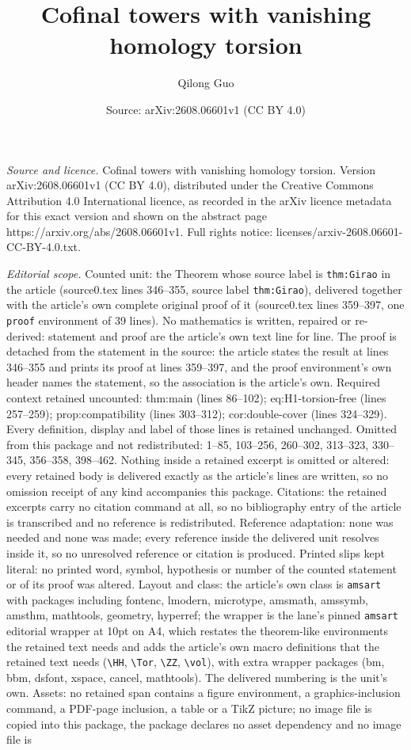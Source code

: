 \documentclass[10pt,a4paper]{amsart}
\title[Cofinal towers with vanishing homology torsion]{Cofinal towers with vanishing homology torsion}
\author{Qilong Guo}
\date{Source: arXiv:2608.06601v1 (CC BY 4.0)}
\begin{document}
\maketitle

\noindent\emph{Source and licence.} Cofinal towers with vanishing homology torsion. Version arXiv:2608.06601v1 (CC BY 4.0), distributed under the Creative Commons Attribution 4.0 International licence, as recorded in the arXiv licence metadata for this exact version and shown on the abstract page https://arxiv.org/abs/2608.06601v1. Full rights notice: licenses/arxiv-2608.06601-CC-BY-4.0.txt.\par\smallskip

\noindent\textit{Editorial scope.} Counted unit: the Theorem whose source label is \texttt{thm:Girao} in the article (source0.tex lines 346--355, source label \texttt{thm:Girao}), delivered together with the article's own complete original proof of it (source0.tex lines 359--397, one \texttt{proof} environment of 39 lines). No mathematics is written, repaired or re-derived: statement and proof are the article's own text line for line. The proof is detached from the statement in the source: the article states the result at lines 346--355 and prints its proof at lines 359--397, and the proof environment's own header names the statement, so the association is the article's own. Required context retained uncounted: thm:main (lines 86--102); eq:H1-torsion-free (lines 257--259); prop:compatibility (lines 303--312); cor:double-cover (lines 324--329). Every definition, display and label of those lines is retained unchanged. Omitted from this package and not redistributed: 1--85, 103--256, 260--302, 313--323, 330--345, 356--358, 398--462. Nothing inside a retained excerpt is omitted or altered: every retained body is delivered exactly as the article's lines are written, so no omission receipt of any kind accompanies this package. Citations: the retained excerpts carry no citation command at all, so no bibliography entry of the article is transcribed and no reference is redistributed. Reference adaptation: none was needed and none was made; every reference inside the delivered unit resolves inside it, so no unresolved reference or citation is produced. Printed slips kept literal: no printed word, symbol, hypothesis or number of the counted statement or of its proof was altered. Layout and class: the article's own class is \texttt{amsart} with packages including fontenc, lmodern, microtype, amsmath, amssymb, amsthm, mathtools, geometry, hyperref; the wrapper is the lane's pinned \texttt{amsart} editorial wrapper at 10pt on A4, which restates the theorem-like environments the retained text needs and adds the article's own macro definitions that the retained text needs (\texttt{\textbackslash HH}, \texttt{\textbackslash Tor}, \texttt{\textbackslash ZZ}, \texttt{\textbackslash vol}), with extra wrapper packages (bm, bbm, dsfont, xspace, cancel, mathtools). The delivered numbering is the unit's own. Assets: no retained span contains a figure environment, a graphics-inclusion command, a PDF-page inclusion, a table or a TikZ picture; no image file is copied into this package, the package declares no asset dependency and no image file is 
\end{document}
